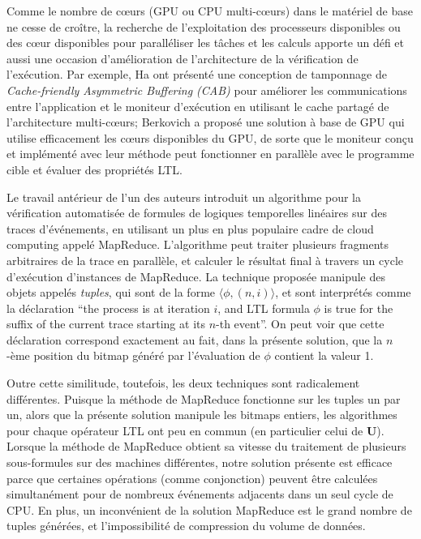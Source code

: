 Comme le nombre de c\oe{}urs (GPU ou CPU multi-c\oe{}urs) dans le matériel de base ne cesse de croître, la recherche de l'exploitation des processeurs disponibles ou des c\oe{}ur disponibles pour paralléliser les tâches et les calculs apporte un défi et aussi une occasion d'amélioration de l'architecture de la vérification de l'exécution. Par exemple, Ha \etal\@ \citep{ha2009concurrent} ont présenté une conception de tamponnage de \emph{Cache-friendly Asymmetric Buffering (CAB)} pour améliorer les communications entre l'application et le moniteur d'exécution en utilisant le cache partagé de l'architecture multi-c\oe{}urs; Berkovich \etal\@ \citep{DBLP:journals/fmsd/BerkovichBF15} a proposé une solution à base de GPU qui utilise efficacement les c\oe{}urs disponibles du GPU, de sorte que le moniteur conçu et implémenté avec leur méthode peut fonctionner en parallèle avec le programme cible et évaluer des propriétés LTL.

Le travail antérieur de l'un des auteurs \citep{jocasa} introduit un algorithme pour la vérification automatisée de formules de logiques temporelles linéaires sur des traces d'événements, en utilisant un plus en plus populaire cadre de cloud computing appelé MapReduce. L'algorithme peut traiter plusieurs fragments arbitraires de la trace en parallèle, et calculer le résultat final à travers un cycle d'exécution d'instances de MapReduce.
La technique proposée manipule des objets appelés \emph{tuples}, qui sont de la forme $\langle \phi, (n, i)\rangle$, et sont interprétés comme la déclaration ``the process is at iteration $i$, and LTL formula $\phi$ is true for the suffix of the current trace starting at its $n$-th event''. On peut voir que cette déclaration correspond exactement au fait, dans la présente solution, que la $n$-ème position du bitmap généré par l'évaluation de $\phi$ contient la valeur 1.

Outre cette similitude, toutefois, les deux techniques sont radicalement différentes. Puisque la méthode de MapReduce fonctionne sur les tuples un par un, alors que la présente solution manipule les bitmaps entiers, les algorithmes pour chaque opérateur LTL ont peu en commun (en particulier celui de \textbf{U}). Lorsque la méthode de MapReduce obtient sa vitesse du traitement de plusieurs sous-formules sur des machines différentes, notre solution présente est efficace parce que certaines opérations (comme conjonction) peuvent être calculées simultanément pour de nombreux événements adjacents dans un seul cycle de CPU. En plus, un inconvénient de la solution MapReduce est le grand nombre de tuples générées, et l'impossibilité de compression du volume de données.


